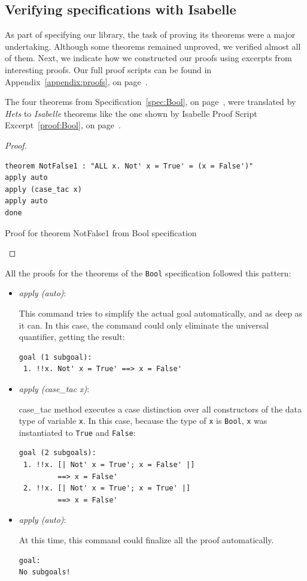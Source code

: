 \documentclass[12pt,twoside]{article}
\numberwithin{spec}{subsection}
\numberwithin{proof}{subsection}
\numberwithin{figure}{subsection}
\numberwithin{code}{subsection}
\newcommand{\citeAppendix}[1][appendix:proofs]{Appendix~\ref{#1}, on page~\pageref{#1}}
\newcommand{\citeSpec}[1]{Specification~\ref{#1}, on page~\pageref{#1}}
\newcommand{\citeProof}[1]{Isabelle Proof Script Excerpt~\ref{#1}, on page~\pageref{#1}}
\begin{document}
\clearpage

\subsection{Verifying specifications with Isabelle}
As part of specifying our library, the task of proving its theorems were a major undertaking. Although some theorems remained unproved, we verified almost all of them. Next, we indicate how we constructed our proofs using excerpts from interesting proofs. Our full proof scripts can be found in \citeAppendix.

The four theorems from \citeSpec{spec:Bool}, were translated by \textit{Hets} to \textit{Isabelle} theorems like the one shown by \citeProof{proof:Bool}.

\begin{proof}
\begin{verbatim}
theorem NotFalse1 : "ALL x. Not' x = True' = (x = False')"
apply auto
apply (case_tac x)
apply auto
done
\end{verbatim}
\caption{Proof for theorem NotFalse1 from Bool specification}
\label{proof:Bool}
\end{proof}

All the proofs for the theorems of the \verb.Bool. specification followed this pattern:
\begin{itemize}
\item \textit{apply (auto)}:

This command tries to simplify the actual goal automatically, and as deep as it can. In this case, the command could only eliminate the universal quantifier, getting the result:
\begin{verbatim}
goal (1 subgoal):
 1. !!x. Not' x = True' ==> x = False'
\end{verbatim}

\item \textit{apply (case\_tac x)}:

case\_tac method executes a case distinction over all constructors of the data type of variable \verb.x.. In this case, because the type of \verb.x. is \verb.Bool., \verb.x. was instantiated to \verb.True. and \verb.False.:
\begin{verbatim}
goal (2 subgoals):
 1. !!x. [| Not' x = True'; x = False' |]
         ==> x = False'
 2. !!x. [| Not' x = True'; x = True' |]
         ==> x = False'
\end{verbatim}

\item \textit{apply (auto)}:

At this time, this command could finalize all the proof automatically. 
\begin{verbatim}
goal:
No subgoals!
\end{verbatim}
\end{itemize}
\end{document}
